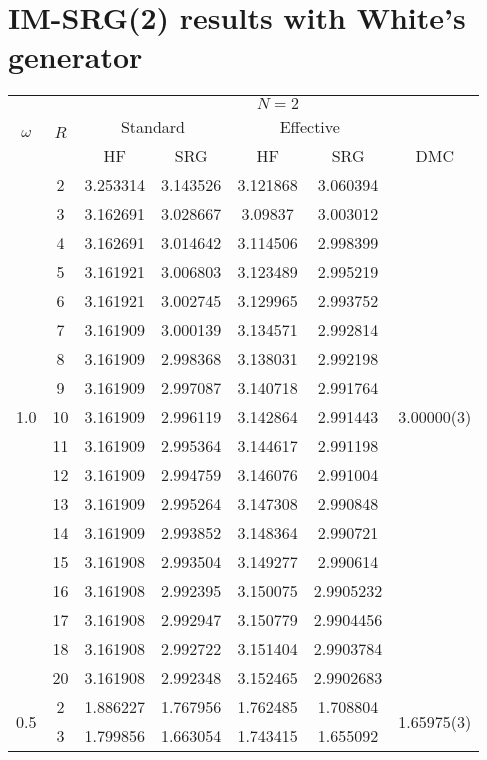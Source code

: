 \section{IM-SRG(2) results with White's generator}
\begin{table}[h!]
\begin{center}
\tabcolsep=0.35cm
\begin{tabular}{|c|c|c|c|c|c|c|}
\hline
\multirow{3}{*}{$\omega$} & \multirow{3}{*}{$R$} & \multicolumn{5}{|c|}{$N=2$} \\
& & \multicolumn{2}{|c|}{Standard} & \multicolumn{2}{|c|}{Effective} &  \\
& & HF & SRG & HF & SRG & DMC \\
\hline\hline
\multirow{17}{*}{1.0} & 2&3.253314 &3.143526 &3.121868 & 3.060394& \multirow{17}{*}{3.00000(3)} \\ %
& 3&3.162691 &3.028667 &3.09837 &3.003012 & \\
& 4&3.162691 &3.014642 &3.114506 &2.998399 & \\
& 5&3.161921 &3.006803 &3.123489 &2.995219 & \\
& 6&3.161921 &3.002745 &3.129965 &2.993752 & \\
& 7&3.161909 &3.000139 &3.134571 &2.992814 & \\
& 8&3.161909 &2.998368 &3.138031 &2.992198 & \\
& 9&3.161909 &2.997087 &3.140718 &2.991764 & \\
& 10&3.161909 &2.996119 &3.142864 &2.991443 & \\
& 11&3.161909 &2.995364 &3.144617 &2.991198 & \\
& 12&3.161909&2.994759 &3.146076 &2.991004 & \\
& 13& 3.161909&2.995264 &3.147308 &2.990848 & \\
& 14& 3.161909& 2.993852 & 3.148364  &2.990721 &\\
& 15& 3.161908& 2.993504  &3.149277 &2.990614 &\\
& 16& 3.161908 &2.992395 &3.150075&2.9905232 &\\
& 17& 3.161908&2.992947 &3.150779 &2.9904456 &\\ 
& 18&3.161908 &2.992722 &3.151404 &2.9903784 & \\
&20 &3.161908 &2.992348 &3.152465 &2.9902683 & \\
\hline
\multirow{15}{*}{0.5} & 2&1.886227 &1.767956 &1.762485 &1.708804 & \multirow{15}{*}{1.65975(3)} \\ %
& 3&1.799856 &1.663054 &1.743415 &1.655092 & \\

\end{tabular}
\end{center}
\end{table}
